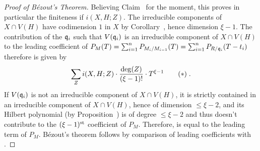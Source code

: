 \documentclass[a4paper,parskip=half,numbers=enddot, DIV=12, headheight=30pt]{scrreprt}
\begin{document}
\begin{proof}[Proof of B\'ezout's Theorem]
     Believing Claim~ for the moment, this proves in particular the finiteness if $i(X,H;Z)$. The irreducible components of $X\cap V(H)$ have codimension $1$ in $X$ by Corollary~, hence dimension $\xi-1$. The contribution of the $\mathfrak{q}_i$ such that $V(\mathfrak{q}_i)$ is an irreducible component of $X\cap V(H)$ to the leading coefficient of $P_M (T) = \sum_{i=1}^n P_{M_i/M_{i-1}}(T) = \sum_{i=1}^n P_{R/\mathfrak{q}_i}(T-t_i)$ therefore is given by
    \begin{align*}
        \sum_{Z} i(X,H;Z) \cdot \frac{\deg(Z)}{(\xi-1)!}\cdot T^{\xi-1}\tag{$*$} \lbl{eq:bezoutLeadingCoeff}\;.
    \end{align*}
    If $V(\mathfrak{q}_i)$ is not an irreducible component of $X\cap V(H)$, it is strictly contained in an irreducible component of $X\cap V(H)$, hence of dimension $\leq\xi-2$, and its Hilbert polynomial (by Proposition~) is of degree $\leq\xi-2$ and thus doesn't contribute to the $(\xi-1)^{\text{st}}$ coefficient of $P_M$. Therefore,  is equal to the leading term of $P_M$. B\'ezout's theorem follows by comparison of leading coefficients with .
    

\end{proof}
\end{document}
